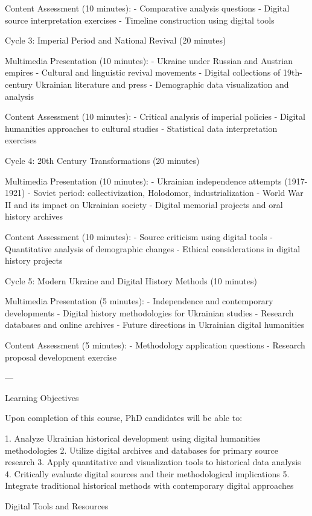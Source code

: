  Content Assessment (10 minutes): 
- Comparative analysis questions
- Digital source interpretation exercises
- Timeline construction using digital tools

    Cycle 3: Imperial Period and National Revival (20 minutes) 

 Multimedia Presentation (10 minutes): 
- Ukraine under Russian and Austrian empires
- Cultural and linguistic revival movements
- Digital collections of 19th-century Ukrainian literature and press
- Demographic data visualization and analysis

 Content Assessment (10 minutes): 
- Critical analysis of imperial policies
- Digital humanities approaches to cultural studies
- Statistical data interpretation exercises

    Cycle 4: 20th Century Transformations (20 minutes) 

 Multimedia Presentation (10 minutes): 
- Ukrainian independence attempts (1917-1921)
- Soviet period: collectivization, Holodomor, industrialization
- World War II and its impact on Ukrainian society
- Digital memorial projects and oral history archives

 Content Assessment (10 minutes): 
- Source criticism using digital tools
- Quantitative analysis of demographic changes
- Ethical considerations in digital history projects

    Cycle 5: Modern Ukraine and Digital History Methods (10 minutes) 

 Multimedia Presentation (5 minutes): 
- Independence and contemporary developments
- Digital history methodologies for Ukrainian studies
- Research databases and online archives
- Future directions in Ukrainian digital humanities

 Content Assessment (5 minutes): 
- Methodology application questions
- Research proposal development exercise

---

   Learning Objectives 

Upon completion of this course, PhD candidates will be able to:

1.  Analyze Ukrainian historical development  using digital humanities methodologies
2.  Utilize digital archives and databases  for primary source research
3.  Apply quantitative and visualization tools  to historical data analysis
4.  Critically evaluate digital sources  and their methodological implications
5.  Integrate traditional historical methods  with contemporary digital approaches

   Digital Tools and Resources 

